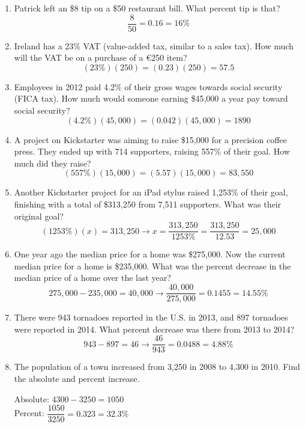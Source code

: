 \begin{enumerate}
\item Patrick left an \$8 tip on a \$50 restaurant bill.  What percent tip is that? 
\[\dfrac{8}{50} = 0.16 = 16\%\]

\item Ireland has a 23\% VAT (value-added tax, similar to a sales tax).  How much will the VAT be on a purchase of a \euro 250 item? 
\[(23\%)(250) = (0.23)(250) = 57.5\]

\item Employees in 2012 paid 4.2\% of their gross wages towards social security (FICA tax).  How much would someone earning \$45,000 a year pay toward social security? 
\[(4.2\%)(45,000) = (0.042)(45,000) = 1890\]

\item A project on Kickstarter was aiming to raise \$15,000 for a precision coffee press.  They ended up with 714 supporters, raising 557\% of their goal.  How much did they raise? 
\[(557\%)(15,000) = (5.57)(15,000) = 83,550\]

\item Another Kickstarter project for an iPad stylus raised 1,253\% of their goal, finishing with a total of \$313,250 from 7,511 supporters.  What was their original goal? 
\[(1253\%)(x) = 313,250 \longrightarrow x = \dfrac{313,250}{1253\%} = \dfrac{313,250}{12.53} = 25,000\]

\item One year ago the median price for a home was \$275,000.  Now the current median price for a home is \$235,000.  What was the percent decrease in the median price of a home over the last year? 
\[275,000 - 235,000 = 40,000 \longrightarrow \dfrac{40,000}{275,000} = 0.1455 = 14.55\%\]

\item There were 943 tornadoes reported in the U.S. in 2013, and 897 tornadoes were reported in 2014.  What percent decrease was there from 2013 to 2014? 
\[943 - 897 = 46 \longrightarrow \dfrac{46}{943} = 0.0488 = 4.88\%\]

\item The population of a town increased from 3,250 in 2008 to 4,300 in 2010.  Find the absolute and percent increase. 
\begin{center}
Absolute: $4300 - 3250 = 1050$\\
Percent: $\dfrac{1050}{3250} = 0.323 = 32.3\%$
\end{center}


\end{enumerate}
